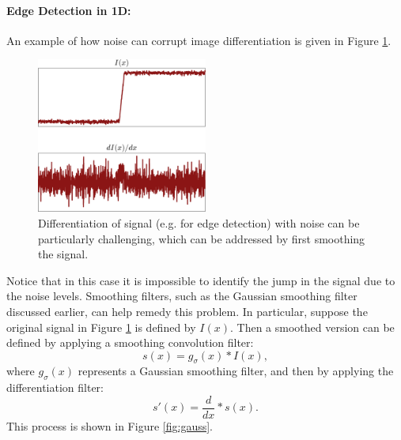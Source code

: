 \paragraph{Edge Detection in 1D:}
An example of how noise can corrupt image differentiation is given in Figure \ref{fig:noisy}. 
\begin{figure}[ht]
  \centering
  \includegraphics[width=0.5\textwidth]{tex/figs/ch10_figs/edge_detection.png}
    \caption{Differentiation of signal (e.g. for edge detection) with noise can be particularly challenging, which can be addressed by first smoothing the signal.}
    \label{fig:noisy}
\end{figure}
Notice that in this case it is impossible to identify the jump in the signal due to the noise levels.
Smoothing filters, such as the Gaussian smoothing filter discussed earlier, can help remedy this problem. In particular, suppose the original signal in Figure \ref{fig:noisy} is defined by $I(x)$. Then a smoothed version can be defined by applying a smoothing convolution filter:
\begin{equation*}
s(x) = g_\sigma(x) \ast I(x),
\end{equation*}
where $g_\sigma(x)$ represents a Gaussian smoothing filter, and then by applying the differentiation filter:
\begin{equation*}
s'(x)=\frac{d}{dx}\ast s(x).
\end{equation*}
This process is shown in Figure \ref{fig:gauss}.
